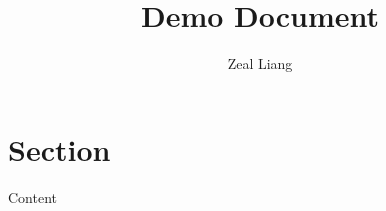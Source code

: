 \documentclass[12pt, a4paper]{article}
\title{{Demo Document}}
\author{{Zeal Liang}}
\begin{document}
\maketitle

\section{Section}
Content
\end{document}
